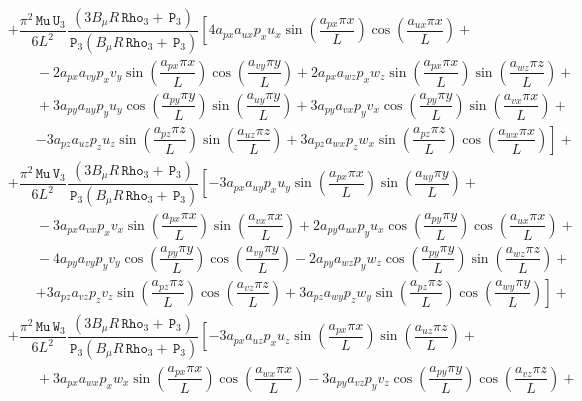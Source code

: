 \documentclass[10pt]{article}
\newcommand{\Rho}{\,\mathtt{Rho}}
\newcommand{\PP}{\,\mathtt{P}}
\newcommand{\U}{\,\mathtt{U}}
\newcommand{\V}{\,\mathtt{V}}
\newcommand{\W}{\,\mathtt{W}}
\newcommand{\MU}{\,\mathtt{Mu}}
\begin{document}
\begin{equation}
 \begin{split}\label{eq:ns_3d_e}
&+ \dfrac{ \pi^2 \MU \U_3 }{6L^2} \dfrac{(3 B_\mu R \Rho_3+\PP_3)}{\PP_3  (B_\mu R \Rho_3+\PP_3) }  \left[4 a_{px} a_{ux} p_x u_x \sin\left(\dfrac{a_{px} \pi x}{L}\right) \cos\left(\dfrac{a_{ux} \pi x}{L}\right)+\right.\\
    &\qquad-2 a_{px} a_{vy} p_x v_y \sin\left(\dfrac{a_{px} \pi x}{L}\right) \cos\left(\dfrac{a_{vy} \pi y}{L}\right)+2 a_{px} a_{wz} p_x w_z \sin\left(\dfrac{a_{px} \pi x}{L}\right) \sin\left(\dfrac{a_{wz} \pi z}{L}\right)+\\
    &\qquad+3 a_{py} a_{uy} p_y u_y \cos\left(\dfrac{a_{py} \pi y}{L}\right) \sin\left(\dfrac{a_{uy} \pi y}{L}\right)+3 a_{py} a_{vx} p_y v_x \cos\left(\dfrac{a_{py} \pi y}{L}\right) \sin\left(\dfrac{a_{vx} \pi x}{L}\right)+\\
    &\qquad\left. -3 a_{pz} a_{uz} p_z u_z \sin\left(\dfrac{a_{pz} \pi z}{L}\right) \sin\left(\dfrac{a_{uz} \pi z}{L}\right)+3 a_{pz} a_{wx}  p_z w_x \sin\left(\dfrac{a_{pz} \pi z}{L}\right) \cos\left(\dfrac{a_{wx} \pi x}{L}\right)\right] +\\
%
&+ \dfrac{  \pi^2 \MU \V_3 }{6L^2} \dfrac{(3 B_\mu R \Rho_3+\PP_3)}{\PP_3  (B_\mu R \Rho_3+\PP_3) } \left[-3 a_{px} a_{uy} p_x u_y \sin\left(\dfrac{a_{px} \pi x}{L}\right) \sin\left(\dfrac{a_{uy} \pi y}{L}\right)+\right.\\
    &\qquad-3 a_{px} a_{vx} p_x v_x \sin\left(\dfrac{a_{px} \pi x}{L}\right) \sin\left(\dfrac{a_{vx} \pi x}{L}\right)+2 a_{py} a_{ux} p_y u_x \cos\left(\dfrac{a_{py} \pi y}{L}\right) \cos\left(\dfrac{a_{ux} \pi x}{L}\right)+\\
    &\qquad-4 a_{py} a_{vy} p_y v_y \cos\left(\dfrac{a_{py} \pi y}{L}\right) \cos\left(\dfrac{a_{vy} \pi y}{L}\right)-2 a_{py} a_{wz} p_y w_z \cos\left(\dfrac{a_{py} \pi y}{L}\right) \sin\left(\dfrac{a_{wz} \pi z}{L}\right)+\\
    &\qquad\left. +3 a_{pz} a_{vz} p_z v_z \sin\left(\dfrac{a_{pz} \pi z}{L}\right) \cos\left(\dfrac{a_{vz} \pi z}{L}\right)+3 a_{pz} a_{wy} p_z w_y \sin\left(\dfrac{a_{pz} \pi z}{L}\right) \cos\left(\dfrac{a_{wy} \pi y}{L}\right)\right] +\\
%
&+\dfrac{  \pi^2 \MU \W_3 }{6L^2} \dfrac{(3 B_\mu R \Rho_3+\PP_3)}{\PP_3  (B_\mu R \Rho_3+\PP_3) }   \left[-3 a_{px} a_{uz} p_x u_z \sin\left(\dfrac{a_{px} \pi x}{L}\right) \sin\left(\dfrac{a_{uz} \pi z}{L}\right)+\right.\\
    &\qquad+3 a_{px} a_{wx} p_x w_x \sin\left(\dfrac{a_{px} \pi x}{L}\right) \cos\left(\dfrac{a_{wx} \pi x}{L}\right)-3 a_{py} a_{vz} p_y v_z \cos\left(\dfrac{a_{py} \pi y}{L}\right) \cos\left(\dfrac{a_{vz} \pi z}{L}\right)+\\

\end{split}
\end{equation}
\end{document}
